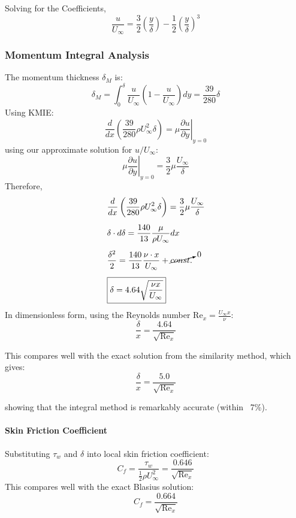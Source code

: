 Solving for the Coefficients, 
%
\[
    \boxed{
    \frac{u}{U_\infty} = \frac{3}{2}\left(\frac{y}{\delta}\right) - \frac{1}{2}\left(\frac{y}{\delta}\right)^3
    }
\]


\subsubsection*{Momentum Integral Analysis}

The momentum thickness $\delta_M$ is:
\[
    \delta_M = \int_0^\delta \frac{u}{U_\infty}\left(1-\frac{u}{U_\infty}\right)dy = \frac{39}{280}\delta 
\]
%
Using KMIE:
\[
    \frac{d}{d x}\left(\frac{39}{280} \rho U_{\infty}^2 \delta\right)= \left.\mu \frac{\partial u}{\partial y}\right|_{y=0}
\]
%
using our approximate solution for $u/U_\infty$:
\[
    \left.\mu \frac{\partial u}{\partial y}\right|_{y=0} = \frac{3}{2} \mu \frac{U_{\infty}}{\delta}
\]
%
Therefore,
\[
    \begin{aligned}
        & \frac{d}{d x}\left(\frac{39}{280} \rho U_{\infty}^2 \delta\right) = \frac{3}{2} \mu \frac{U_{\infty}}{\delta}
        \\[.5em]
        &\delta \cdot d \delta  =\frac{140}{13} \frac{\mu}{\rho U_\infty} d x
        \\[0.5em]
        &\frac{\delta^2}{2} =\frac{140}{13} \frac{\nu \cdot x}{U_\infty}+ \cancelto{0}{const.}
        \\[0.5em]
        & \boxed{
        \delta  =4.64 \sqrt{\frac{\nu x}{U_{\infty}}}
        } 
    \end{aligned}
\]
%
In dimensionless form, using the Reynolds number $\text{Re}_x = \frac{U_\infty x}{\nu}$:
%
\[
    \boxed{
        \frac{\delta}{x} = \frac{4.64}{\sqrt{\text{Re}_x}}
        }
\]

This compares well with the exact solution from the similarity method, which gives:
\[
\frac{\delta}{x} = \frac{5.0}{\sqrt{\text{Re}_x}}
\]

showing that the integral method is remarkably accurate (within ~7\%).

\paragraph{Skin Friction Coefficient}
Substituting $\tau_w$ and $\delta$ into local skin friction coefficient:
\[
    C_f = \frac{\tau_w}{\frac{1}{2}\rho U_\infty^2}  = \frac{0.646}{\sqrt{\text{Re}_x}}
\]
%
This compares well with the exact Blasius solution:
\[
    C_f = \frac{0.664}{\sqrt{\text{Re}_x}}
\]

